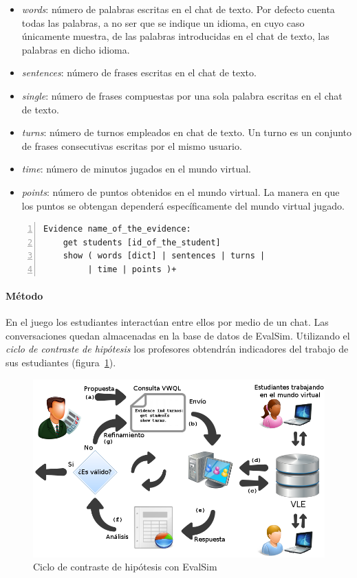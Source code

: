 \begin{itemize}
\item \emph{words}: número de palabras escritas en el chat de texto. Por defecto cuenta todas las palabras, a no ser que se indique un idioma, en cuyo caso únicamente muestra, de las palabras introducidas en el chat de texto, las palabras en dicho idioma.
\item \emph{sentences}: número de frases escritas en el chat de texto.
\item \emph{single}: número de frases compuestas por una sola palabra escritas en el chat de texto.
\item \emph{turns}: número de turnos empleados en chat de texto. Un turno es un conjunto de frases consecutivas escritas por el mismo usuario.
\item \emph{time}: número de minutos jugados en el mundo virtual.
\item \emph{points}: número de puntos obtenidos en el mundo virtual. La manera en que los puntos se obtengan dependerá específicamente del mundo virtual jugado.
\end{itemize}

\begin{lstlisting}[caption=Palabras reservadas y formato de VWQL (version 0.1), label=code:reserved,numbers=left, captionpos=b, morekeywords={Evidence,get, students, show, words, sentences, turns, time, points}]
Evidence name_of_the_evidence:
    get students [id_of_the_student]
    show ( words [dict] | sentences | turns |
         | time | points )+
\end{lstlisting}

\paragraph{Método}

En el juego los estudiantes interactúan entre ellos por medio de un chat. Las conversaciones quedan almacenadas en la base de datos de EvalSim. Utilizando el \emph{ciclo de contraste de hipótesis} los profesores obtendrán indicadores del trabajo de sus estudiantes (figura~\ref{fig:EvsDiagram}).

\begin{figure}
  \begin{center}
    \includegraphics[scale=0.4]{EvsDiagram.png}
  \end{center}
  \caption{Ciclo de contraste de hipótesis con EvalSim}
  \label{fig:EvsDiagram}
\end{figure}

